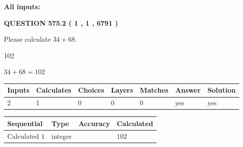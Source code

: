 \documentclass[12pt]{article}
\begin{document}
   
   
   
\noindent{}
   
   
   
   
\noindent\vspace{0.1in}\hspace{-0.08in} {\textbf{\Large{All inputs: }}}
   
   
  
\vspace{0.2in}
  
{\textbf{\Large{QUESTION
575.2 
 ( 1 , 1 , 6791 )
}}}
  
  
 
Please calculate $ %
34 +  %
68 $.
 
 
 
\noindent{}
 
 

102
 
 
\noindent{}
 
 

 
 
 
\noindent{}
 
 

$ %
34 +  %
68=   %
102$
 
 
\noindent{}
 
 

 
   
   
   
   
\noindent\begin{tabular}{|l|l|l|l|l|l|l|}
 \hline
Inputs & Calculates & Choices & Layers & Matches & Answer & Solution \\ \hline
 2  & 
 1  & 
 0
  & 
 0  & 
 0  & 
  yes & 
  yes 
  \\ \hline
 \end{tabular}
   
   
   
   
\noindent{}
   
   
  
  
\noindent\begin{tabular}{|l|l|l|l|}
\hline
 Sequential & Type & Accuracy & Calculated \\ 
\hline
 
 
  Calculated $  1 $ & integer &  & 
  $ 102 $ 
 \\  \hline  
 \end{tabular}
   
\end{document}
